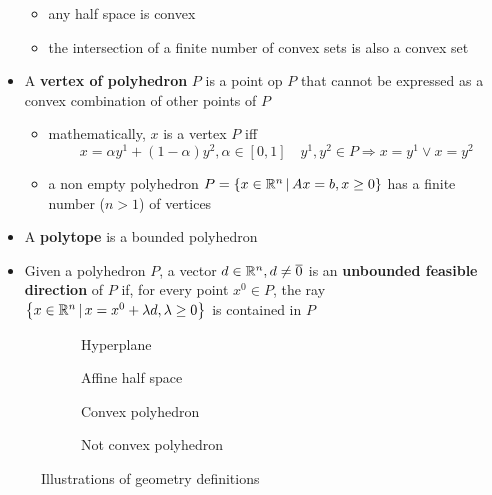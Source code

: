 \documentclass[english]{article}
\begin{document}
\begin{itemize}
        \begin{itemize}
          \item any half space is convex
          \item the intersection of a finite number of convex sets is also a convex set
        \end{itemize}
  \item A \textbf{vertex of polyhedron} \(P\) is a point op \(P\) that cannot be expressed as a convex combination of other points of \(P\)
        \begin{itemize}
          \item mathematically, \(x\) is a vertex \(P\) iff
                \[ x = \alpha y^1 + (1 - \alpha) y^2, \alpha \in \left[ 0, 1 \right] \quad y^1, y^2 \in P \Rightarrow x = y^1 \lor x = y^2 \]
          \item a non empty polyhedron \(P = \left\{ x \in \mathbb{R}^n \, | \,Ax = b, x \geq 0 \right\}\) has a finite number (\(n >1\)) of vertices
        \end{itemize}
  \item A \textbf{polytope} is a bounded polyhedron
  \item Given a polyhedron \(P\), a vector \(d \in \mathbb{R}^n, d \neq \overline{0}\) is an \textbf{unbounded feasible direction} of \(P\) if, for every point \(x^0 \in P\), the ray \(\left\{ x \in \mathbb{R}^n \, | \, x = x^0 + \lambda d, \lambda \geq 0 \right\}\) is contained in \(P\)
\end{itemize}

\begin{figure}[htbp]
  \bigskip
  \centering
  \begin{subfigure}[b]{0.495\textwidth}
    \centering
    \bigskip
    \caption{Hyperplane}
    \label{subfig:hyperplane}
    \bigskip
  \end{subfigure}
  \bigskip
  \begin{subfigure}[b]{0.495\textwidth}
    \centering
    \bigskip
    \caption{Affine half space}
    \label{subfig:affine-half-space}
    \bigskip
  \end{subfigure}
  \begin{subfigure}[h]{0.495\textwidth}
    \centering
    \bigskip
    \caption{Convex polyhedron}
    \label{subfig:convex-hull}
    \bigskip
  \end{subfigure}
  \begin{subfigure}[h]{0.495\textwidth}
    \centering
    \bigskip
    \caption{Not convex polyhedron}
    \label{subfig:not-convex-hull}
    \bigskip
  \end{subfigure}
  \caption{Illustrations of \LP geometry definitions}
  \label{fig:lp-geometry}
  \bigskip
\end{figure}
\end{document}

